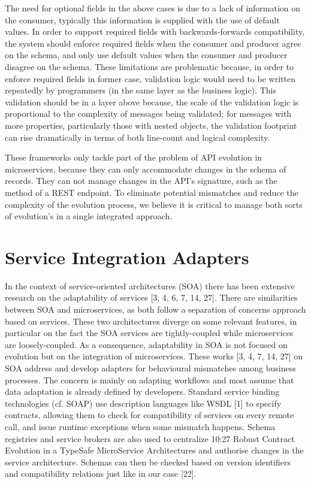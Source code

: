 The need for optional fields in the above cases is due to a lack of information on the consumer, typically this information is supplied with the use of default values.
In order to support required fields with backwards-forwards compatibility, the system should enforce required fields when the consumer and producer agree on the schema,
and only use default values when the consumer and producer disagree on the schema.
These limitations are problematic because, in order to enforce required fields in former case,
validation logic would need to be written repeatedly by programmers (in the same layer as the business logic).
This validation should be in a layer above because, the scale of the validation logic is proportional to the complexity of messages being validated;
for messages with more properties, particularly those with nested objects, the validation footprint can rise dramatically in terms of both line-count and logical complexity.

These frameworks only tackle part of the problem of API evolution in microservices,
because they can only accommodate changes in the schema of records.
They can not manage changes in the API's signature, such as the method of a REST endpoint.
To eliminate potential mismatches and reduce the complexity of the evolution process, we believe it is critical to manage both sorts of evolution's in a single integrated approach.

\section{Service Integration Adapters} %
\label{sec:service_integration_adapters}

In the context of service-oriented architectures (SOA) there has been extensive
research on the adaptability of services [3, 4, 6, 7, 14, 27]. There are similarities
between SOA and microservices, as both follow a separation of concerns approach
based on services. These two architectures diverge on some relevant features, in
particular on the fact the SOA services are tightly-coupled while microservices are
loosely-coupled. As a consequence, adaptability in SOA is not focused on evolution
but on the integration of microservices. These works [3, 4, 7, 14, 27] on SOA address
and develop adapters for behavioural mismatches among business processes. The
concern is mainly on adapting workflows and most assume that data adaptation is
already defined by developers. Standard service binding technologies (cf. SOAP) use
description languages like WSDL [1] to specify contracts, allowing them to check for
compatibility of services on every remote call, and issue runtime exceptions when some
mismatch happens. Schema registries and service brokers are also used to centralize
10:27
Robust Contract Evolution in a TypeSafe MicroService Architectures
and authorise changes in the service architecture. Schemas can then be checked based
on version identifiers and compatibility relations just like in our case [22].


